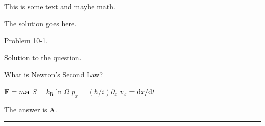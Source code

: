 \documentclass[11pt, addpoints, answers]{exam}
\begin{document}
\begin{questions}


\question \label{ques:questionparts}
This is some text and maybe math.

\droptotalpoints


\begin{solution}
The solution goes here.
\end{solution}


\question[5] \label{ques:questionnoparts}
Problem 10-1.
\droppoints

\begin{solution}
Solution to the question.
\end{solution}


\question[10] \label{ques:questionmc}
What is Newton's Second Law?

\begin{choices}
\choice $\vb{F} = m \vb{a}$
\choice $S = k_\text{B} \ln\Omega$
\choice $p_x = (\hbar/i) \partial_x$
\choice $v_x = \difs xt$
\end{choices}
\droppoints

\begin{solution}
The answer is A.
\end{solution}
  
\end{questions}


\begin{center}
\rule{.5\textwidth}{1pt}
\end{center}
\end{document}

